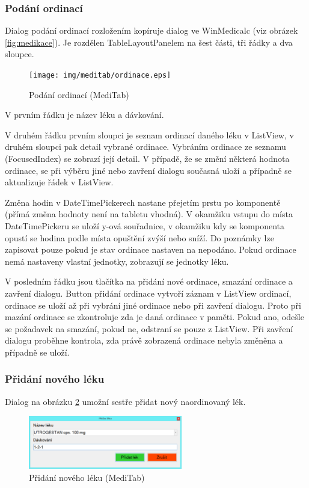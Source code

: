 \subsubsection{Podání ordinací}
\label{ch:ordinace}

Dialog podání ordinací rozložením kopíruje dialog ve WinMedicalc (viz obrázek \ref{fig:medikace}). Je rozdělen TableLayoutPanelem na šest části, tři řádky a dva sloupce.

\begin{figure}[H]
	\centering
	\texttt{[image: img/meditab/ordinace.eps]}
	\caption{Podání ordinací (MediTab)}
  \label{fig:ordinace}
\end{figure}

V prvním řádku je název léku a dávkování.

V druhém řádku prvním sloupci je seznam ordinací daného léku v ListView, v druhém sloupci pak detail vybrané ordinace. Vybráním ordinace ze seznamu (FocusedIndex) se zobrazí její detail. V případě, že se změní některá hodnota ordinace, se při výběru jiné nebo zavření dialogu současná uloží a případně se aktualizuje řádek v ListView.

Změna hodin v DateTimePickerech nastane přejetím prstu po komponentě (přímá změna hodnoty není na tabletu vhodná). V okamžiku vstupu do místa DateTimePickeru se uloží y-ová souřadnice, v okamžiku kdy se komponenta opustí se hodina podle místa opuštění zvýší nebo sníží. Do poznámky lze zapisovat pouze pokud je stav ordinace nastaven na nepodáno. Pokud ordinace nemá nastaveny vlastní jednotky, zobrazují se jednotky léku.

V posledním řádku jsou tlačítka na přidání nové ordinace, smazání ordinace a zavření dialogu. Button přidání ordinace vytvoří záznam v ListView ordinací, ordinace se uloží až při vybrání jiné ordinace nebo při zavření dialogu. Proto při mazání ordinace se zkontroluje zda je daná ordinace v paměti. Pokud ano, odešle se požadavek na smazání, pokud ne, odstraní se pouze z ListView. Při zavření dialogu proběhne kontrola, zda právě zobrazená ordinace nebyla změněna a případně se uloží.


\subsubsection{Přidání nového léku}
\label{ch:pridat_lek}

Dialog na obrázku \ref{fig:medikace_pridat_lek} umožní sestře přidat nový naordinovaný lék.

\begin{figure}[H]
	\centering
	\includegraphics[width=0.6\textwidth]{img/meditab/medikace_pridat_lek.eps}
	\caption{Přidání nového léku (MediTab)}
  \label{fig:medikace_pridat_lek}
\end{figure}

